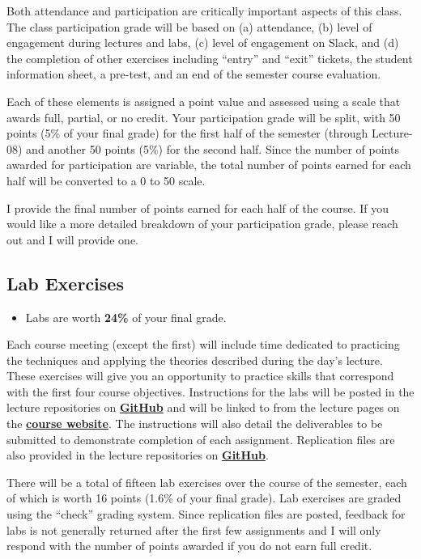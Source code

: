 \documentclass[]{book}
\newenvironment{rmdblock}[1]
  {\begin{shaded*}
  \begin{itemize}
  \renewcommand{\labelitemi}{
    \raisebox{-.7\height}[0pt][0pt]{
      {\setkeys{Gin}{width=3em,keepaspectratio}\texttt{[image: images/\#1]}}
    }
  }
  \item
  }
  {
  \end{itemize}
  \end{shaded*}
  }
\newenvironment{rmdtip}
  {\begin{rmdblock}{tip}}
  {\end{rmdblock}}
\begin{document}
Both attendance and participation are critically important aspects of this class. The class participation grade will be based on (a) attendance, (b) level of engagement during lectures and labs, (c) level of engagement on Slack, and (d) the completion of other exercises including ``entry'' and ``exit'' tickets, the student information sheet, a pre-test, and an end of the semester course evaluation.

Each of these elements is assigned a point value and assessed using a scale that awards full, partial, or no credit. Your participation grade will be split, with 50 points (5\% of your final grade) for the first half of the semester (through Lecture-08) and another 50 points (5\%) for the second half. Since the number of points awarded for participation are variable, the total number of points earned for each half will be converted to a 0 to 50 scale.

I provide the final number of points earned for each half of the course. If you would like a more detailed breakdown of your participation grade, please reach out and I will provide one.

\hypertarget{lab-exercises}{%
\subsection{Lab Exercises}\label{lab-exercises}}

\begin{rmdtip}
Labs are worth \textbf{24\%} of your final grade.
\end{rmdtip}

Each course meeting (except the first) will include time dedicated to practicing the techniques and applying the theories described during the day's lecture. These exercises will give you an opportunity to practice skills that correspond with the first four course objectives. Instructions for the labs will be posted in the lecture repositories on \href{https://github.com/slu-soc5650}{\textbf{GitHub}} and will be linked to from the lecture pages on the \href{https://slu-soc5650.github.io/}{\textbf{course website}}. The instructions will also detail the deliverables to be submitted to demonstrate completion of each assignment. Replication files are also provided in the lecture repositories on \href{https://github.com/slu-soc5650}{\textbf{GitHub}}.

There will be a total of fifteen lab exercises over the course of the semester, each of which is worth 16 points (1.6\% of your final grade). Lab exercises are graded using the ``check'' grading system. Since replication files are posted, feedback for labs is not generally returned after the first few assignments and I will only respond with the number of points awarded if you do not earn full credit.
\end{document}

